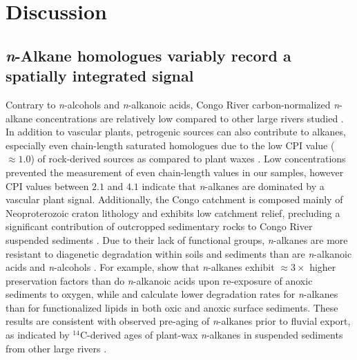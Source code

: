 \section{Discussion}

\subsection{\textit{n}-Alkane homologues variably record a spatially integrated signal}

Contrary to \textit{n}-alcohols and \textit{n}-alkanoic acids, Congo River carbon-normalized \textit{n}-alkane concentrations are relatively low compared to other large rivers studied \citep{vanDongen:2008kj,Galy:2011ix,Tao:2015bq}. In addition to vascular plants, petrogenic sources can also contribute to alkanes, especially even chain-length saturated homologues due to the low CPI value ($\approx 1.0$) of rock-derived sources as compared to plant waxes \citep{Eglinton:1967uz,Brooks:1969wh}. Low concentrations prevented the measurement of even chain-length  values in our samples, however CPI values between $2.1$ and $4.1$ indicate that \textit{n}-alkanes are dominated by a vascular plant signal. Additionally, the Congo catchment is composed mainly of Neoproterozoic craton lithology and exhibits low catchment relief, precluding a significant contribution of outcropped sedimentary rocks to Congo River suspended sediments \citep{Milliman:2011ug,Galy:2015fx}. Due to their lack of functional groups, \textit{n}-alkanes are more resistant to diagenetic degradation within soils and sediments than are \textit{n}-alkanoic acids and \textit{n}-alcohols \citep{Cranwell:1981vg,Meyers:1993up,Meyers:1993vwa, SinningheDamste:2002ud,vanDongen:2008kj}. For example, \citet{Hoefs:2002wu} show that \textit{n}-alkanes exhibit $\approx 3\times$ higher preservation factors than do \textit{n}-alkanoic acids upon re-exposure of anoxic sediments to oxygen, while \citet{Canuel:1996ta} and \citet{Sun:1994wj} calculate lower degradation rates for \textit{n}-alkanes than for functionalized lipids in both oxic and anoxic surface sediments. These results are consistent with observed pre-aging of \textit{n}-alkanes prior to fluvial export, as indicated by $^{14}$C-derived ages of plant-wax \textit{n}-alkanes in suspended sediments from other large rivers \citep[\textit{e.g.}][]{Gustafsson:2011ht,Tao:2015bq}.

